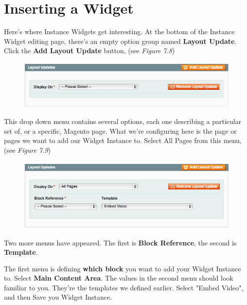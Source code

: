\documentclass[oneside]{book}
\begin{document}
\section{Inserting a Widget}

Here's where Instance Widgets get interesting. At the bottom of the Instance Widget editing page, there's an empty option group named \textbf{Layout Update}.  Click the \textbf{Add Layout Update} button, (see \emph{Figure 7.8}) 

\begin{figure}[htb]
\begin{center}
\leavevmode
\includegraphics[width=1\textwidth]{images/chapter7/instance-displayon.png}
\end{center}
\caption{}
\end{figure}


This drop down menu contains several options, each one describing a particular set of, or a specific, Magento page.  What we're configuring here is the page or pages we want to add our Widget Instance to.  Select All Pages from this menu, (see \emph{Figure 7.9})

\begin{figure}[htb]
\begin{center}
\leavevmode
\includegraphics[width=1\textwidth]{images/chapter7/instance-pageselected.png}
\end{center}
\caption{}
\end{figure}


Two more menus have appeared.  The first is \textbf{Block Reference}, the second is \textbf{Template}.  

The first menu is defining \textbf{which block} you want to add your Widget Instance to.  Select \textbf{Main Content Area}.  The values in the second menu should look familiar to you.  They're the templates we defined earlier.  Select "Embed Video", and then Save you Widget Instance.
\end{document}
